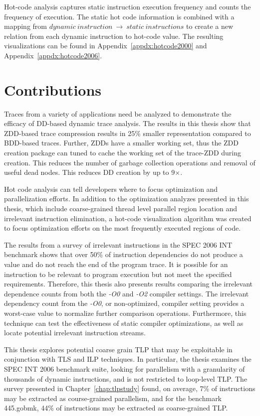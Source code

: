 \documentclass[defaultstyle,11pt]{thesis}
\begin{document}
Hot-code analysis captures static instruction execution frequency and
counts the frequency of execution.  The static hot code information is
combined with a mapping from $dynamic\ instruction \ \rightarrow
\ static\ instructions$ to create a new relation from each dynamic
instruction to hot-code value.  The resulting visualizations can be
found in Appendix~\ref{appdx:hotcode2000} and
Appendix~\ref{appdx:hotcode2006}.

\section{Contributions}

Traces from a variety of applications need be analyzed to demonstrate
the efficacy of DD-based dynamic trace analysis. The results in this
thesis show that ZDD-based trace compression results in 25\% smaller
representation compared to BDD-based traces.  Further, ZDDs have a
smaller working set, thus the ZDD creation package can tuned to cache
the working set of the trace-ZDD during creation.  This reduces the
number of garbage collection operations and removal of useful dead
nodes. This reduces DD creation by up to 9$\times$.

Hot code analysis can tell developers where to focus optimization and
parallelization efforts. In addition to the optimization analyzes
presented in this thesis, which include coarse-grained thread level
parallel region location and irrelevant instruction elimination, a
hot-code visualization algorithm was created to focus optimization
efforts on the most frequently executed regions of code.

The results from a survey of irrelevant instructions in the SPEC 2006
INT benchmark shows that over 50\% of instruction dependencies do not
produce a value and do not reach the end of the program trace.  It is
possible for an instruction to be relevant to program execution but
not meet the specified requirements.  Therefore, this thesis also
presents results comparing the irrelevant dependence counts from both
the \textit{-O0} and \textit{-O2} compiler settings. The irrelevant
dependency count from the \textit{-O0}, or non-optimized, compiler
setting provides a worst-case value to normalize further comparison
operations.  Furthermore, this technique can test the effectiveness of
static compiler optimizations, as well as locate potential irrelevant
instruction streams.

This thesis explores potential coarse grain TLP that may be
exploitable in conjunction with TLS and ILP techniques.  In
particular, the thesis examines the SPEC INT 2006 benchmark suite,
looking for parallelism with a granularity of thousands of dynamic
instructions, and is not restricted to loop-level TLP. The survey
presented in Chapter~\ref{chap:tlpstudy} found, on average, 7\% of
instructions may be extracted as course-grained parallelism, and for
the benchmark 445.gobmk, 44\% of instructions may be extracted as
coarse-grained TLP.
\end{document}
